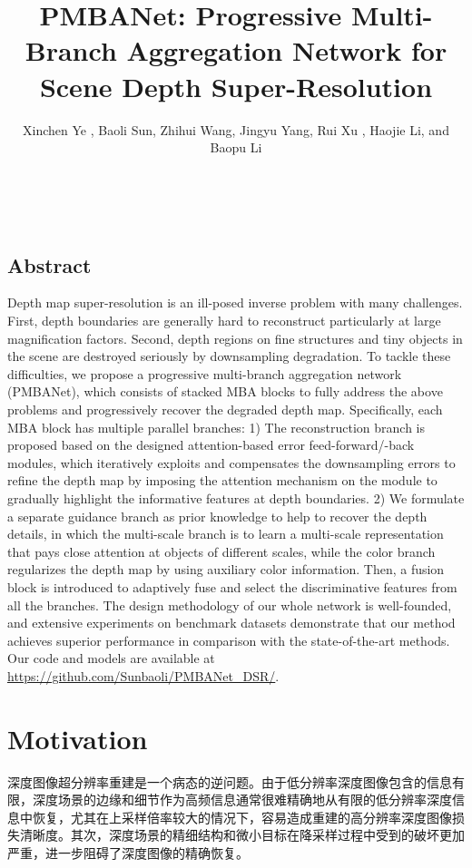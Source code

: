 \documentclass[14px]{article}
\title{\Huge{PMBANet: Progressive Multi-Branch Aggregation Network for Scene Depth Super-Resolution}}
\author{
	Xinchen Ye , Baoli Sun, Zhihui Wang, Jingyu Yang, Rui Xu , Haojie Li, and Baopu Li %
}
\makeatletter
\renewcommand{\maketitle}{\bgroup\setlength{\parindent}{0pt}
\@title\\[0.5em]
\large\textit{\@author}
\egroup}
\makeatother
\begin{document}
\maketitle
\label{title}

\vspace{0.5em}
\subsection*{Abstract} 
\label{abstract}
Depth map super-resolution is an ill-posed inverse problem with many challenges. First, depth boundaries are generally hard to reconstruct particularly at large magnification factors. Second, depth regions on fine structures and tiny objects in the scene are destroyed seriously by downsampling degradation. To tackle these difficulties, we propose a progressive multi-branch aggregation network (PMBANet), which consists of stacked MBA blocks to fully address the above problems and progressively recover the degraded depth map. Specifically, each MBA block has multiple parallel branches: 1) The reconstruction branch is proposed based on the designed attention-based error feed-forward/-back modules, which iteratively exploits and compensates the downsampling errors to refine the depth map by imposing the attention mechanism on the module to gradually highlight the informative features at depth boundaries. 2) We formulate a separate guidance branch as prior knowledge to help to recover the depth details, in which the multi-scale branch is to learn a multi-scale representation that pays close attention at objects of different scales, while the color branch regularizes the depth map by using auxiliary color information. Then, a fusion block is introduced to adaptively fuse and select the discriminative features from all the branches. The design methodology of our whole network is well-founded, and extensive experiments on benchmark datasets demonstrate that our method achieves superior performance in comparison with the state-of-the-art methods. Our code and models are available at \href{https://github.com/Sunbaoli/PMBANet\_DSR/}{https://github.com/Sunbaoli/PMBANet\_DSR/}.


\section{Motivation}
\label{motivation}

深度图像超分辨率重建是一个病态的逆问题。由于低分辨率深度图像包含的信息有限，深度场景的边缘和细节作为高频信息通常很难精确地从有限的低分辨率深度信息中恢复，尤其在上采样倍率较大的情况下，容易造成重建的高分辨率深度图像损失清晰度。其次，深度场景的精细结构和微小目标在降采样过程中受到的破坏更加严重，进一步阻碍了深度图像的精确恢复。
\end{document}
